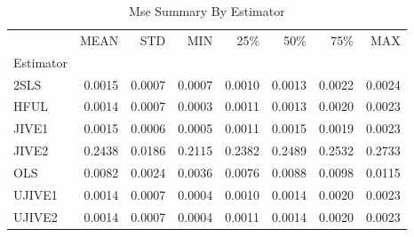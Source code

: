 \begin{table}[ht]
\centering
\caption{Mse Summary By Estimator}
\begin{tabular}{lrrrrrrr}
\toprule
 & MEAN & STD & MIN & 25\% & 50\% & 75\% & MAX \\
Estimator &  &  &  &  &  &  &  \\
\midrule
2SLS & 0.0015 & 0.0007 & 0.0007 & 0.0010 & 0.0013 & 0.0022 & 0.0024 \\
HFUL & 0.0014 & 0.0007 & 0.0003 & 0.0011 & 0.0013 & 0.0020 & 0.0023 \\
JIVE1 & 0.0015 & 0.0006 & 0.0005 & 0.0011 & 0.0015 & 0.0019 & 0.0023 \\
JIVE2 & 0.2438 & 0.0186 & 0.2115 & 0.2382 & 0.2489 & 0.2532 & 0.2733 \\
OLS & 0.0082 & 0.0024 & 0.0036 & 0.0076 & 0.0088 & 0.0098 & 0.0115 \\
UJIVE1 & 0.0014 & 0.0007 & 0.0004 & 0.0010 & 0.0014 & 0.0020 & 0.0023 \\
UJIVE2 & 0.0014 & 0.0007 & 0.0004 & 0.0011 & 0.0014 & 0.0020 & 0.0023 \\
\bottomrule
\end{tabular}
\end{table}
